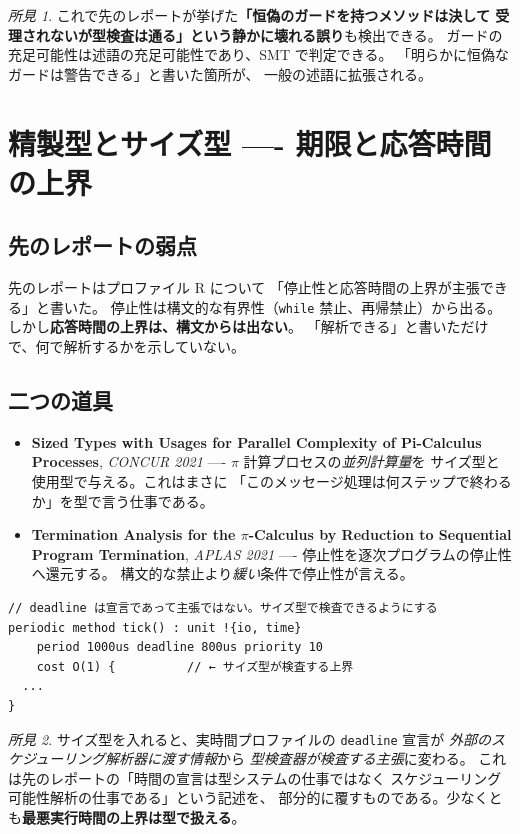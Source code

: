 \documentclass[11pt,a4paper]{ltjsarticle}
\theoremstyle{remark}
\newtheorem{finding}{所見}
\newcommand{\pp}[2]{\textbf{#1}, \emph{#2}}
\begin{document}
\begin{finding}
これで先のレポートが挙げた\textbf{「恒偽のガードを持つメソッドは決して
受理されないが型検査は通る」という静かに壊れる誤り}も検出できる。
ガードの充足可能性は述語の充足可能性であり、SMT で判定できる。
「明らかに恒偽なガードは警告できる」と書いた箇所が、
一般の述語に拡張される。
\end{finding}

\section{精製型とサイズ型 ---- 期限と応答時間の上界}

\subsection{先のレポートの弱点}

先のレポートはプロファイル R について
「停止性と応答時間の上界が主張できる」と書いた。
停止性は構文的な有界性（\texttt{while} 禁止、再帰禁止）から出る。
しかし\textbf{応答時間の上界は、構文からは出ない}。
「解析できる」と書いただけで、何で解析するかを示していない。

\subsection{二つの道具}

\begin{itemize}
\item \pp{Sized Types with Usages for Parallel Complexity of Pi-Calculus
  Processes}{CONCUR 2021} ---- $\pi$ 計算プロセスの\emph{並列計算量}を
  サイズ型と使用型で与える。これはまさに
  「このメッセージ処理は何ステップで終わるか」を型で言う仕事である。
\item \pp{Termination Analysis for the $\pi$-Calculus by Reduction to Sequential
  Program Termination}{APLAS 2021} ---- 停止性を逐次プログラムの停止性へ還元する。
  構文的な禁止より\emph{緩い}条件で停止性が言える。
\end{itemize}

\begin{lstlisting}[language=AIPL]
// deadline は宣言であって主張ではない。サイズ型で検査できるようにする
periodic method tick() : unit !{io, time}
    period 1000us deadline 800us priority 10
    cost O(1) {          // ← サイズ型が検査する上界
  ...
}
\end{lstlisting}

\begin{finding}
サイズ型を入れると、実時間プロファイルの \texttt{deadline} 宣言が
\emph{外部のスケジューリング解析器に渡す情報}から
\emph{型検査器が検査する主張}に変わる。
これは先のレポートの「時間の宣言は型システムの仕事ではなく
スケジューリング可能性解析の仕事である」という記述を、
部分的に覆すものである。少なくとも\textbf{最悪実行時間の上界は型で扱える}。
\end{finding}
\end{document}
